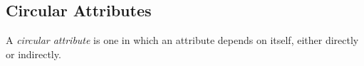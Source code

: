 \subsection{Circular Attributes}\label{subsec:Circular_Attributes}
\begin{definition}\label{def:Circular_Attribute}
  A \emph{circular attribute} is one in which an attribute depends on itself, either directly or indirectly.
\end{definition}

